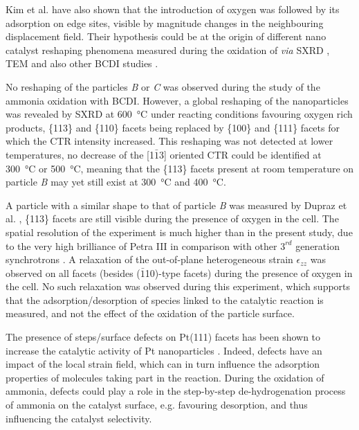 Kim et al. \parencite*{Kim2018} have also shown that the introduction of oxygen was followed by its adsorption on edge sites, visible by magnitude changes in the neighbouring displacement field.
Their hypothesis could be at the origin of different nano catalyst reshaping phenomena measured during the oxidation of  \textit{via} SXRD \parencite{Nolte2008, Hejral2016}, TEM \parencite{Vendelbo2014} and also other BCDI studies \parencite{Abuin2019}.

No reshaping of the particles \textit{B} or \textit{C} was observed during the study of the ammonia oxidation with BCDI.
However, a global reshaping of the nanoparticles was revealed by SXRD at \qty{600}{\degreeCelsius} under reacting conditions favouring oxygen rich products, \{113\} and \{110\} facets being replaced by \{100\} and \{111\} facets for which the CTR intensity increased.
This reshaping was not detected at lower temperatures, no decrease of the [1$\bar{1}$3] oriented CTR could be identified at \qty{300}{\degreeCelsius} or \qty{500}{\degreeCelsius}, meaning that the \{113\} facets present at room temperature on particle \textit{B} may yet still exist at \qty{300}{\degreeCelsius} and \qty{400}{\degreeCelsius}.

A particle with a similar shape to that of particle \textit{B} was measured by Dupraz et al. \parencite*{Dupraz2022}, \{113\} facets are still visible during the presence of oxygen in the cell.
The spatial resolution of the experiment is much higher than in the present study, due to the very high brilliance of Petra III in comparison with other $3^{rd}$ generation synchrotrons \parencite{Bilderback2005}.
A relaxation of the out-of-plane heterogeneous strain $\epsilon_{zz}$ was observed on all facets (besides ($\bar{1}$10)-type facets) during the presence of oxygen in the cell.
No such relaxation was observed during this experiment, which supports that the adsorption/desorption of species linked to the catalytic reaction is measured, and not the effect of the oxidation of the particle surface.

The presence of steps/surface defects on Pt(111) facets has been shown to increase the catalytic activity of Pt nanoparticles \parencite{Segner1984, Chen2012}.
Indeed, defects have an impact of the local strain field, which can in turn influence the adsorption properties of molecules taking part in the reaction.
During the oxidation of ammonia, defects could play a role in the step-by-step de-hydrogenation process of ammonia on the catalyst surface, e.g. favouring  desorption, and thus influencing the catalyst selectivity.

